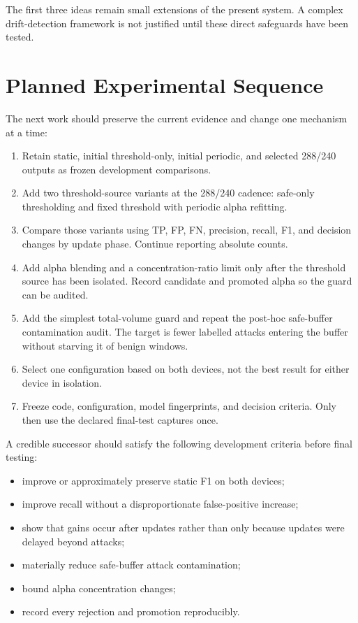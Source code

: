 \documentclass[11pt,a4paper]{article}
\begin{document}
The first three ideas remain small extensions of the present system. A complex
drift-detection framework is not justified until these direct safeguards have
been tested.

\section{Planned Experimental Sequence}

The next work should preserve the current evidence and change one mechanism at
a time:

\begin{enumerate}
  \item Retain static, initial threshold-only, initial periodic, and selected
  288/240 outputs as frozen development comparisons.
  \item Add two threshold-source variants at the 288/240 cadence: safe-only
  thresholding and fixed threshold with periodic alpha refitting.
  \item Compare those variants using TP, FP, FN, precision, recall, F1, and
  decision changes by update phase. Continue reporting absolute counts.
  \item Add alpha blending and a concentration-ratio limit only after the
  threshold source has been isolated. Record candidate and promoted alpha so
  the guard can be audited.
  \item Add the simplest total-volume guard and repeat the post-hoc safe-buffer
  contamination audit. The target is fewer labelled attacks entering the
  buffer without starving it of benign windows.
  \item Select one configuration based on both devices, not the best result for
  either device in isolation.
  \item Freeze code, configuration, model fingerprints, and decision criteria.
  Only then use the declared final-test captures once.
\end{enumerate}

A credible successor should satisfy the following development criteria before
final testing:

\begin{itemize}
  \item improve or approximately preserve static F1 on both devices;
  \item improve recall without a disproportionate false-positive increase;
  \item show that gains occur after updates rather than only because updates
  were delayed beyond attacks;
  \item materially reduce safe-buffer attack contamination;
  \item bound alpha concentration changes;
  \item record every rejection and promotion reproducibly.
\end{itemize}
\end{document}
